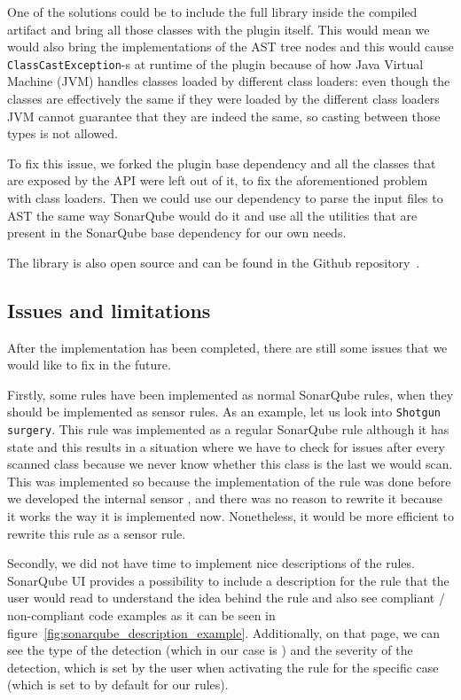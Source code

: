 One of the solutions could be to include the full library inside the compiled artifact and bring all those classes with
the plugin itself.
This would mean we would also bring the implementations of the AST tree nodes and this would cause
\verb|ClassCastException|-s at runtime of the plugin because of how Java Virtual Machine (JVM) handles classes loaded
by different class loaders: even though the classes are effectively the same if they were loaded by the different class loaders
JVM cannot guarantee that they are indeed the same, so casting between those types is not allowed.

To fix this issue, we forked the plugin base dependency and all the classes
that are exposed by the API were left out of it, to fix the aforementioned problem with class loaders.
Then we could use our dependency to parse the input files to AST the same way SonarQube would do it
and use all the utilities that are present in the SonarQube base dependency for our own needs.

The library is also open source and can be found in the Github repository~\cite{sonar_java_extracted}.

\subsection{Issues and limitations}\label{subsec:issues-and-limitations}

After the implementation has been completed, there are still some issues that we would like to fix in the future.

Firstly, some rules have been implemented as normal SonarQube rules, when they should be implemented as sensor rules.
As an example, let us look into \verb|Shotgun surgery|.
This rule was implemented as a regular SonarQube rule although it has state and this results in a situation where
we have to check for issues after every scanned class because we never know whether this class is the last we would scan.
This was implemented so because the implementation of the rule was done before we developed the internal sensor ,
and there was no reason to rewrite it because it works the way it is implemented now.
Nonetheless, it would be more efficient to rewrite this rule as a sensor rule.

Secondly, we did not have time to implement nice descriptions of the rules.
SonarQube UI provides a possibility to include a description for the rule that the user would read to understand the idea behind the rule and also see compliant / non-compliant code examples as it can be seen
in figure~\ref{fig:sonarqube_description_example}.
Additionally, on that page, we can see the type of the detection (which in our case is ) and
the severity of the detection, which is set by the user when activating the rule for the specific case (which is set to  by default for our rules).

